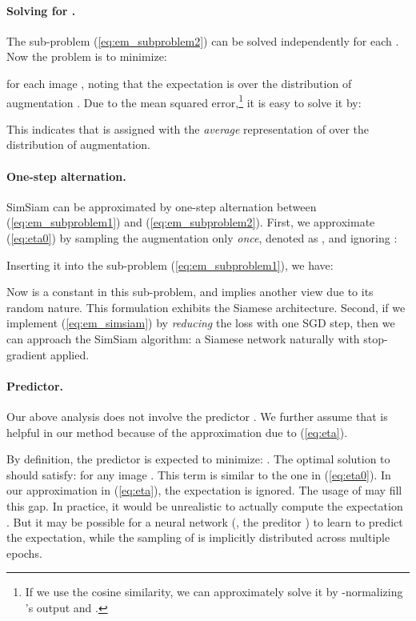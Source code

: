 \documentclass[final]{cvpr}
\begin{document}
\paragraph{Solving for .} The sub-problem (\ref{eq:em_subproblem2}) can be solved independently for each . Now the problem is to minimize:

for each image , noting that the expectation is over the distribution of augmentation .
Due to the mean squared error,\footnote{If we use the cosine similarity, we can approximately 
solve it by -normalizing 's output and .} it is easy to solve it by:

This indicates that  is assigned with the \emph{average} representation of  over the distribution of augmentation.

\paragraph{One-step alternation.} SimSiam can be approximated by one-step alternation between (\ref{eq:em_subproblem1}) and (\ref{eq:em_subproblem2}).
First, we approximate (\ref{eq:eta0}) by 
sampling the augmentation only \emph{once}, denoted as , and ignoring :

Inserting it into the sub-problem (\ref{eq:em_subproblem1}), we have:

Now  is a constant in this sub-problem, and  implies another view due to its random nature. This formulation exhibits the Siamese architecture. 
Second, if we implement (\ref{eq:em_simsiam}) by \emph{reducing} the loss with one SGD step, then we can approach the SimSiam algorithm: a Siamese network naturally with stop-gradient applied.

\paragraph{Predictor.}
Our above analysis does not involve the predictor . We further assume that  is helpful in our method because of the approximation due to (\ref{eq:eta}).

By definition, the predictor  is expected to minimize:
.
The optimal solution to  should satisfy:
 for any image .
This term is similar to the one in (\ref{eq:eta0}).
In our approximation in (\ref{eq:eta}),
the expectation  is ignored. The usage of  may fill this gap.
In practice, it would be unrealistic to actually compute the expectation . But it may be possible for a neural network (\eg, the preditor ) to learn to predict the expectation, while the sampling of  is implicitly distributed across multiple epochs. 
\end{document}
